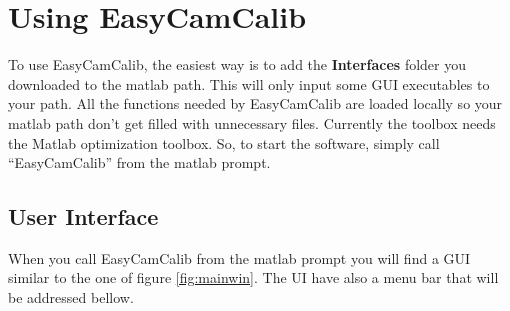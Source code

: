 \documentclass[article,11pt]{memoir}
\begin{document}
\chapter{Using EasyCamCalib}

To use EasyCamCalib, the easiest way is to add the \textbf{Interfaces} folder you downloaded to the matlab path. This will only input some GUI executables to your path. All the functions needed by EasyCamCalib are loaded locally so your matlab path don't get filled with unnecessary files. Currently the toolbox needs the Matlab optimization toolbox. So, to start the software, simply call ``EasyCamCalib'' from the matlab prompt.

\section{User Interface}

When you call EasyCamCalib from the matlab prompt you will find a GUI similar to the one of figure \ref{fig:mainwin}. The UI have also a menu bar that will be addressed bellow.
\end{document}
